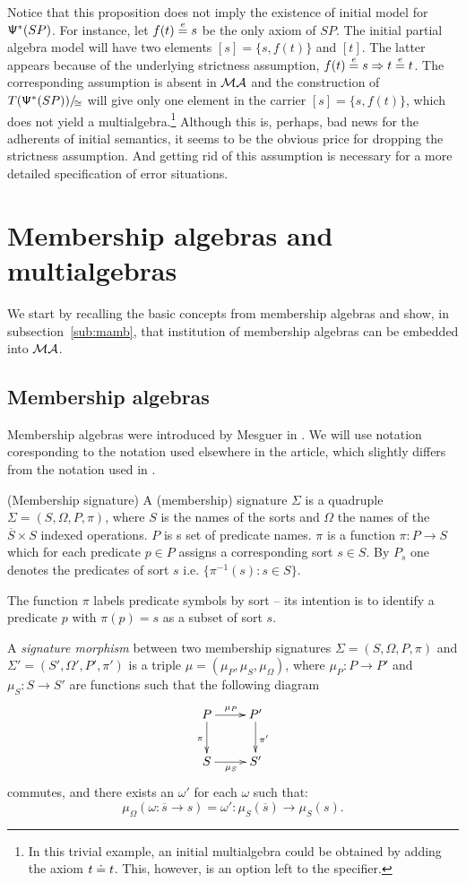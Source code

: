 \documentclass[10pt]{article}
\begin{document}
%
Notice that this proposition does not imply the existence of initial model
for ${\sf {\Psi}}^*(SP)$. For instance, let $f(t)\stackrel{e}{=} s$ be the only axiom of
$SP$. The initial partial algebra model will have two elements
$[s]=\{s,f(t)\}$ and $[t]$. The latter appears because of the underlying
strictness assumption, $f(t)\stackrel{e}{=} s\Rightarrow t\stackrel{e}{=} t$. The corresponding assumption
is absent in ${\mathcal{MA}}$ and the construction of $T({\sf {\Psi}}^*(SP))/\!_{\cong}$
will give only one element in the carrier $[s]=\{s,f(t)\}$, which does not yield a
multialgebra.\footnote{In this trivial example, an initial multialgebra could
be obtained by adding the axiom $t\mathrel{\dot{=} } t$. This, however, is an option left
to the specifier.} Although this is, perhaps, bad news for the adherents of
initial semantics, it seems to be the obvious price for dropping the
strictness assumption. And getting rid of this assumption is necessary for a
more detailed specification of error situations.

\section{Membership algebras and multialgebras}\label{se:member}
We start by recalling the basic concepts from membership algebras and show,
in subsection~\ref{sub:mamb}, that institution of membership algebras can be
embedded into ${\mathcal{MA}}$.
%
\subsection{Membership algebras}
Membership algebras were introduced by Mesguer in \cite{member}. We will use
notation coresponding to the notation used elsewhere in the article, which slightly differs
from the notation used in \cite{member}.

\begin{definition} (Membership signature)
A (membership) signature $\Sigma$ is a quadruple $\Sigma=(S,\Omega,P,\pi)$, where $S$ is
the names of the sorts and $\Omega$ the names of the $\overline{S} \times
S$ indexed operations. $P$ is s set of predicate names. $\pi$ is a function
$\pi:P \to S$ which for each predicate $p \in P$ assigns a corresponding sort
$s \in S$. By $P_s$ one denotes the predicates of sort $s$
i.e. $\{\pi^{-1}(s): s\in S\}$.
\end{definition}
%
The function $\pi$ labels predicate symbols by sort -- its intention is to
identify a predicate $p$ with $\pi(p)=s$ as a subset of sort $s$.

\begin{definition}
A {\it signature morphism} between two membership signatures $\Sigma =
(S,\Omega,P,\pi)$ and $\Sigma' = (S',\Omega',P',\pi')$ is a triple $\mu =
(\mu_P,\mu_S,\mu_{\Omega})$, where $\mu_P: P \to P'$ and $\mu_S: S \to S'$
are functions such that the following diagram
\[ \xymatrix{
   P \ar[d]_{\pi} \ar[r]^{\mu_P} & P' \ar[d]^{\pi'}	\\
   S \ar[r]_{\mu_S} & S'	}
\]
commutes, and there exists an $\omega'$ for each $\omega$ such that:
\[ \mu_{\Omega}(\omega: \overline{s} \to s) = \omega': \mu_S(\overline{s}) \to \mu_S(s) .\]
\end{definition}
\end{document}
